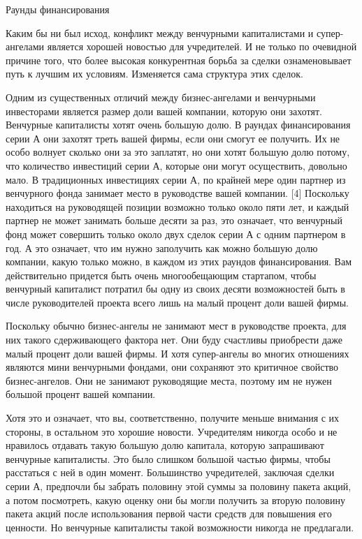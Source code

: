 \documentclass[ebook,12pt,oneside,openany]{memoir}
\begin{document}
Раунды финансирования

Каким бы ни был исход, конфликт между венчурными капиталистами и
супер-ангелами является хорошей новостью для учредителей. И не только
по очевидной причине того, что более высокая конкурентная борьба за
сделки ознаменовывает путь к лучшим их условиям. Изменяется сама
структура этих сделок.

Одним из существенных отличий между бизнес-ангелами и венчурными
инвесторами является размер доли вашей компании, которую они захотят.
Венчурные капиталисты хотят очень большую долю. В раундах
финансирования серии А они захотят треть вашей фирмы, если они смогут
ее получить. Их не особо волнует сколько они за это заплатят, но они
хотят большую долю потому, что количество инвестиций серии А, которые
они могут осуществить, довольно мало. В традиционных инвестициях серии
А, по крайней мере один партнер из венчурного фонда занимает место в
руководстве вашей компании. [4] Поскольку находиться на руководящей
позиции возможно только около пяти лет, и каждый партнер не может
занимать больше десяти за раз, это означает, что венчурный фонд может
совершить только около двух сделок серии А с одним партнером в год. А
это означает, что им нужно заполучить как можно большую долю компании,
какую только можно, в каждом из этих раундов финансирования. Вам
действительно придется быть очень многообещающим стартапом, чтобы
венчурный капиталист потратил бы одну из своих десяти возможностей
быть в числе руководителей проекта всего лишь на малый процент доли
вашей фирмы.

Поскольку обычно бизнес-ангелы не занимают мест в руководстве проекта,
для них такого сдерживающего фактора нет. Они буду счастливы
приобрести даже малый процент доли вашей фирмы. И хотя супер-ангелы во
многих отношениях являются мини венчурными фондами, они сохраняют это
критичное свойство бизнес-ангелов. Они не занимают руководящие места,
поэтому им не нужен большой процент вашей компании.

Хотя это и означает, что вы, соответственно, получите меньше внимания
с их стороны, в остальном это хорошие новости. Учредителям никогда
особо и не нравилось отдавать такую большую долю капитала, которую
запрашивают венчурные капиталисты. Это было слишком большой частью
фирмы, чтобы расстаться с ней в один момент. Большинство учредителей,
заключая сделки серии А, предпочли бы забрать половину этой суммы за
половину пакета акций, а потом посмотреть, какую оценку они бы могли
получить за вторую половину пакета акций после использования первой
части средств для повышения его ценности. Но венчурные капиталисты
такой возможности никогда не предлагали.
\end{document}
